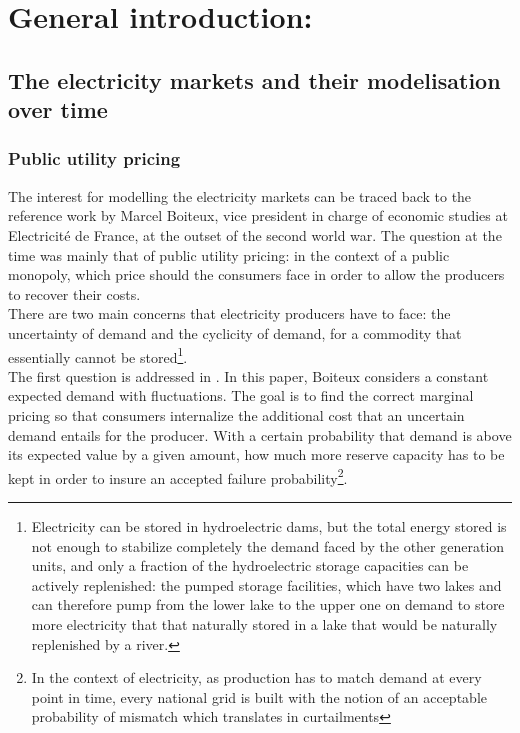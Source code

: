 \renewcommand{\thesection}{\arabic{chapter}.\arabic{section}}

\chapter*{General introduction: }
\label{chap:intro}
\cleardoublepage
\doublespacing

\section*{The electricity markets and their modelisation over time}
\subsection*{Public utility pricing}

The interest for modelling the electricity markets can be traced back to the reference work by Marcel Boiteux, vice president in charge of economic studies at Electricité de France, at the outset of the second world war. The question at the time was mainly that of public utility pricing: in the context of a public monopoly, which price should the consumers face in order to allow the producers to recover their costs. \\

There are two main concerns that electricity producers have to face: the uncertainty of demand and the cyclicity of demand, for a commodity that essentially cannot be stored\footnote{Electricity can be stored in hydroelectric dams, but the total energy stored is not enough to stabilize completely the demand faced by the other generation units, and only a fraction of the hydroelectric storage capacities can be actively replenished: the pumped storage facilities, which have two lakes and can therefore pump from the lower lake to the upper one on demand to store more electricity that that naturally stored in a lake that would be naturally replenished by a river.}. \\

The first question is addressed in \cite{boiteux1951tarification}. In this paper, Boiteux considers a constant expected demand with fluctuations. The goal is to find the correct marginal pricing so that consumers internalize the additional cost that an uncertain demand entails for the producer. With a certain probability that demand is above its expected value by a given amount, how much more reserve capacity has to be kept in order to insure an accepted failure probability\footnote{In the context of electricity, as production has to match demand at every point in time, every national grid is built with the notion of an acceptable probability of mismatch which translates in curtailments}.\\

